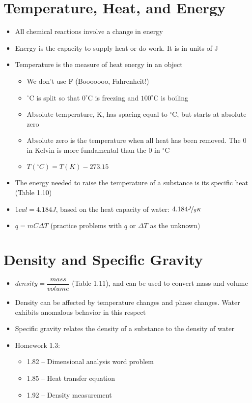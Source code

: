 \documentclass[12pt, openany, letterpaper]{memoir}
\begin{document}
\section{Temperature, Heat, and Energy}
\begin{itemize}
	\item All chemical reactions involve a change in energy
	\item Energy is the capacity to supply heat or do work. It is in units of J
	\item Temperature is the measure of heat energy in an object
	\begin{itemize}
		\item We don't use F (Booooooo, Fahrenheit!)
		\item $^\circ$C is split so that $0^\circ$C is freezing and $100^\circ$C is boiling
		\item Absolute temperature, K, has spacing equal to $^\circ$C, but starts at absolute zero
		\item Absolute zero is the temperature when all heat has been removed. The $0$ in Kelvin is more fundamental than the $0$ in $^\circ$C
		\item $T( ^\circ C) = T(K)-273.15$
	\end{itemize}
	\item The energy needed to raise the temperature of a substance is its specific heat (Table 1.10)	
	\item $1cal=4.184J$, based on the heat capacity of water: $4.184\nicefrac{J}{gK}$
	\item $q=mC\Delta T$ (practice problems with $q$ or $\Delta T$ as the unknown)
\end{itemize}
\section{Density and Specific Gravity}
\begin{itemize}
	\item $density=\dfrac{mass}{volume}$ (Table 1.11), and can be used to convert mass and volume 
	\item Density can be affected by temperature changes and phase changes. Water exhibits anomalous behavior in this respect
	\item Specific gravity relates the density of a substance to the density of water
	\item Homework 1.3:
	\begin{itemize}
		\item 1.82 -- Dimensional analysis word problem
		\item 1.85 -- Heat transfer equation
		\item 1.92 -- Density measurement
	\end{itemize}
\end{itemize}
\end{document}
